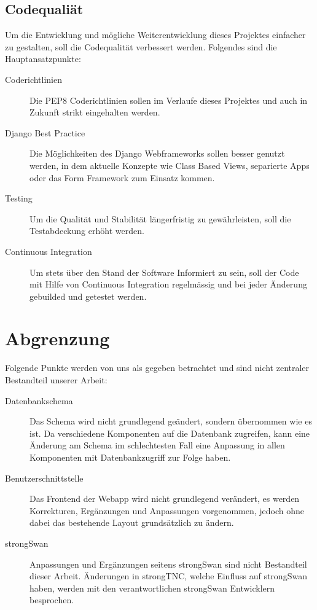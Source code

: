 \subsection{Codequaliät}
Um die Entwicklung und mögliche Weiterentwicklung dieses Projektes einfacher zu
gestalten, soll die Codequalität verbessert werden. Folgendes sind die
Hauptansatzpunkte:
\begin{description}
	\item[Coderichtlinien] Die PEP8 Coderichtlinien sollen im Verlaufe dieses
	Projektes und auch in Zukunft strikt eingehalten werden.
	
	\item[Django Best Practice] Die Möglichkeiten des Django Webframeworks sollen
	besser genutzt werden, in dem aktuelle Konzepte wie Class Based Views,
	separierte Apps oder das Form Framework zum Einsatz kommen.
	
	\item[Testing] Um die Qualität und Stabilität längerfristig zu gewährleisten,
	soll die Testabdeckung erhöht werden.
	
	\item[Continuous Integration] Um stets über den Stand der Software Informiert
	zu sein, soll der Code mit Hilfe von Continuous Integration regelmässig und bei
	jeder Änderung gebuilded und getestet werden.
	
\end{description}


\section{Abgrenzung}
Folgende Punkte werden von uns als gegeben betrachtet und sind nicht zentraler
Bestandteil unserer Arbeit:

\begin{description}
	\item[Datenbankschema] Das Schema wird nicht grundlegend geändert, sondern
	übernommen wie es ist. Da verschiedene Komponenten auf die Datenbank zugreifen,
	kann eine Änderung am Schema im schlechtesten Fall eine Anpassung in allen
	Komponenten mit Datenbankzugriff zur Folge haben.

	\item[Benutzerschnittstelle] Das Frontend der Webapp wird nicht grundlegend
	verändert, es werden Korrekturen, Ergänzungen und Anpassungen vorgenommen,
	jedoch ohne dabei das bestehende Layout grundsätzlich zu ändern.

	\item[strongSwan] Anpassungen und Ergänzungen seitens strongSwan sind nicht
	Bestandteil dieser Arbeit. Änderungen in strongTNC, welche Einfluss auf
	strongSwan haben, werden mit den verantwortlichen strongSwan Entwicklern
	besprochen.
\end{description}


